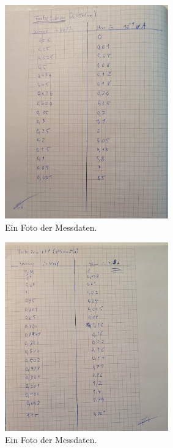 \begin{figure}[H]
    \centering
    \includegraphics[width=0.63\textwidth]{latex/images/D3.jpeg}
    \caption{Ein Foto der Messdaten.}
    \label{img:Daten3}
\end{figure}
\begin{figure}[H]
    \centering
    \includegraphics[width=0.63\textwidth]{latex/images/D4.jpeg}
    \caption{Ein Foto der Messdaten.}
    \label{img:Daten4}
\end{figure}

